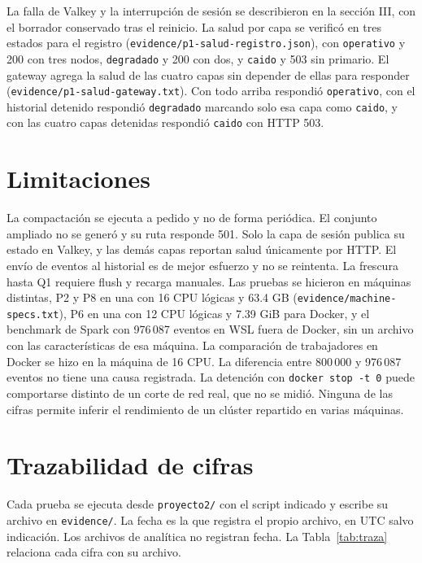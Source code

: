 \documentclass[conference]{IEEEtran}
\begin{document}
La falla de Valkey y la interrupción de sesión se describieron en la sección III, con el borrador conservado tras el reinicio. La salud por capa se verificó en tres estados para el registro (\texttt{evidence/p1-salud-registro.json}), con \texttt{operativo} y 200 con tres nodos, \texttt{degradado} y 200 con dos, y \texttt{caido} y 503 sin primario. El gateway agrega la salud de las cuatro capas sin depender de ellas para responder (\texttt{evidence/p1-salud-gateway.txt}). Con todo arriba respondió \texttt{operativo}, con el historial detenido respondió \texttt{degradado} marcando solo esa capa como \texttt{caido}, y con las cuatro capas detenidas respondió \texttt{caido} con HTTP 503.

\section{Limitaciones}

La compactación se ejecuta a pedido y no de forma periódica. El conjunto ampliado no se generó y su ruta responde 501. Solo la capa de sesión publica su estado en Valkey, y las demás capas reportan salud únicamente por HTTP. El envío de eventos al historial es de mejor esfuerzo y no se reintenta. La frescura hasta Q1 requiere flush y recarga manuales. Las pruebas se hicieron en máquinas distintas, P2 y P8 en una con 16 CPU lógicas y 63.4 GB (\texttt{evidence/machine-specs.txt}), P6 en una con 12 CPU lógicas y 7.39 GiB para Docker, y el benchmark de Spark con 976\,087 eventos en WSL fuera de Docker, sin un archivo con las características de esa máquina. La comparación de trabajadores en Docker se hizo en la máquina de 16 CPU. La diferencia entre 800\,000 y 976\,087 eventos no tiene una causa registrada. La detención con \texttt{docker stop -t 0} puede comportarse distinto de un corte de red real, que no se midió. Ninguna de las cifras permite inferir el rendimiento de un clúster repartido en varias máquinas.

\appendices

\section{Trazabilidad de cifras}

Cada prueba se ejecuta desde \texttt{proyecto2/} con el script indicado y escribe su archivo en \texttt{evidence/}. La fecha es la que registra el propio archivo, en UTC salvo indicación. Los archivos de analítica no registran fecha. La Tabla~\ref{tab:traza} relaciona cada cifra con su archivo.
\end{document}

